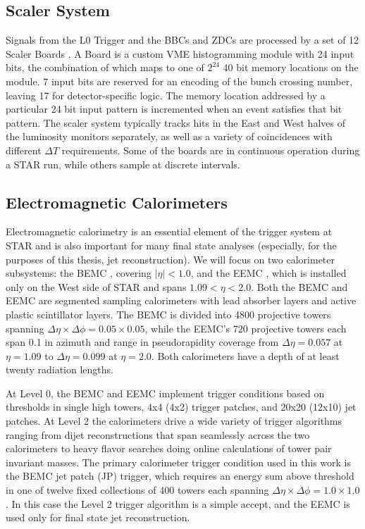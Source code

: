 \subsection{Scaler System\label{sec:scalers}}

Signals from the L0 Trigger and the BBCs and ZDCs are processed by a set of 12
Scaler Boards \cite{scalers}. A Board is a custom VME histogramming module with
24 input bits, the combination of which maps to one of \(2^{24}\) 40 bit memory
locations on the module. 7 input bits are reserved for an encoding of the bunch
crossing number, leaving 17 for detector-specific logic. The memory location
addressed by a particular 24 bit input pattern is incremented when an event
satisfies that bit pattern. The scaler system typically tracks hits in the East
and West halves of the luminosity monitors separately, as well as a variety of
coincidences with different \(\Delta T\) requirements. Some of the boards are in
continuous operation during a STAR run, while others sample at discrete
intervals.

\subsection{Electromagnetic Calorimeters}

Electromagnetic calorimetry is an essential element of the trigger system at
STAR and is also important for many final state analyses (especially, for the
purposes of this thesis, jet reconstruction). We will focus on two calorimeter
subsystems: the BEMC \cite{Beddo:2002zx}, covering $|\eta| < 1.0$, and the
EEMC \cite{Allgower:2002zy}, which is installed only on the West side of STAR
and spans $1.09 < \eta < 2.0$. Both the BEMC and EEMC are segmented sampling
calorimeters with lead absorber layers and active plastic scintillator layers.
The BEMC is divided into 4800 projective towers spanning $\Delta \eta \times
\Delta \phi = 0.05 \times 0.05$, while the EEMC's 720 projective towers each
span 0.1 in azimuth and range in pseudorapidity coverage from $\Delta \eta =
0.057$ at $\eta = 1.09$ to $\Delta \eta = 0.099$ at $\eta = 2.0$. Both
calorimeters have a depth of at least twenty radiation lengths.

At Level 0, the BEMC and EEMC implement trigger conditions based on thresholds
in single high towers, 4x4 (4x2) trigger patches, and 20x20 (12x10) jet
patches. At Level 2 the calorimeters drive a wide variety of trigger
algorithms ranging from dijet reconstructions that span seamlessly across the
two calorimeters to heavy flavor searches doing online calculations of tower
pair invariant masses. The primary calorimeter trigger condition used in this
work is the BEMC jet patch (JP) trigger, which requires an energy sum above
threshold in one of twelve fixed collections of 400 towers each spanning
$\Delta \eta \times \Delta \phi = 1.0 \times 1.0$. In this case the Level 2
trigger algorithm is a simple accept, and the EEMC is used only for final
state jet reconstruction.

